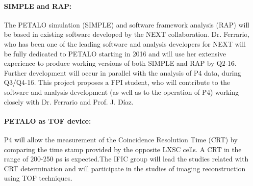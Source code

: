 \paragraph{SIMPLE and RAP:}
The PETALO simulation (SIMPLE) and software framework analysis (RAP) will be based in existing software developed by the NEXT collaboration. Dr. Ferrario, who has been one of the leading software and analysis developers for NEXT will be fully dedicated to PETALO starting in 2016 and will use her extensive experience to produce working versions of both SIMPLE and RAP by Q2-16. Further development will occur in parallel with the analysis of P4 data, during Q3/Q4-16. This project proposes a FPI student, who will contribute to the software and analysis development (as well as to the operation of P4) working closely with Dr. Ferrario and Prof. J. Díaz.

\paragraph{PETALO as TOF device:}
P4 will allow the measurement of the Coincidence Resolution Time (CRT) by comparing the time stamp provided by the opposite LXSC cells. A CRT in the range of 200-250 ps is expected.The IFIC group will lead the studies related with CRT determination and will participate in the studies of imaging reconstruction using TOF techniques. 



